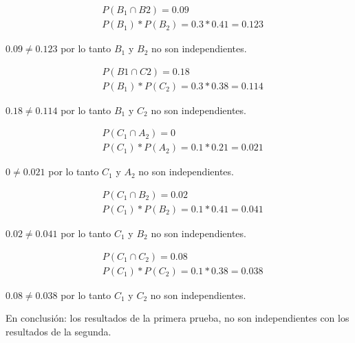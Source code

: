 \documentclass[11pt]{article}
\begin{document}
\begin{align*}
  &P(B_1 \cap B2) = 0.09 \\
  &P(B_1) * P(B_2) = 0.3 * 0.41 = 0.123
\end{align*}
\begin{justify}
  $0.09 \neq 0.123$ por lo tanto $B_1$ y $B_2$ no son independientes.
\end{justify}

\begin{align*}
  &P(B1 \cap C2) = 0.18 \\
  &P(B_1) * P(C_2) = 0.3 * 0.38 = 0.114
\end{align*}
\begin{justify}
  $0.18 \neq 0.114$ por lo tanto $B_1$ y $C_2$ no son independientes.
\end{justify}

\begin{align*}
  &P(C_1 \cap A_2) = 0 \\
  &P(C_1) * P(A_2) = 0.1 * 0.21 = 0.021
\end{align*}
\begin{justify}
  $0 \neq 0.021$ por lo tanto $C_1$ y $A_2$ no son independientes.
\end{justify}

\begin{align*}
  &P(C_1 \cap B_2) = 0.02 \\
  &P(C_1) * P(B_2) = 0.1 * 0.41 = 0.041
\end{align*}
\begin{justify}
  $0.02 \neq 0.041$ por lo tanto $C_1$ y $B_2$ no son independientes.
\end{justify}

\begin{align*}
  &P(C_1 \cap C_2) = 0.08 \\
  &P(C_1) * P(C_2) = 0.1 * 0.38 = 0.038
\end{align*}
\begin{justify}
  $0.08 \neq 0.038$ por lo tanto $C_1$ y $C_2$ no son independientes.
\end{justify}

\begin{justify}
  En conclusión: los resultados de la primera prueba, no son independientes con
    los resultados de la segunda.
\end{justify}

\end{document}
